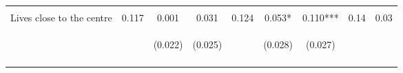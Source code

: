 \begin{table}[h!]
{\begin{tabular}{lcccccccc}
 & \begin{footnotesize}\end{footnotesize} & \begin{footnotesize}[0.041]\end{footnotesize} & \begin{footnotesize}[0.001]\end{footnotesize} & \begin{footnotesize}\end{footnotesize} & \begin{footnotesize}[1.000]\end{footnotesize} & \begin{footnotesize}[0.371]\end{footnotesize} & \begin{footnotesize}\end{footnotesize} & \begin{footnotesize}\end{footnotesize}\\
\noalign{\smallskip}Lives close to the centre & 0.117 & 0.001 & 0.031 & 0.124 & 0.053* & 0.110*** & 0.14 & 0.03\\
 & \begin{footnotesize}\end{footnotesize} & \begin{footnotesize}(0.022)\end{footnotesize} & \begin{footnotesize}(0.025)\end{footnotesize} & \begin{footnotesize}\end{footnotesize} & \begin{footnotesize}(0.028)\end{footnotesize} & \begin{footnotesize}(0.027)\end{footnotesize} & \begin{footnotesize}\end{footnotesize} & \begin{footnotesize}\end{footnotesize}\\
 & \begin{footnotesize}\end{footnotesize} & \begin{footnotesize}[0.240]\end{footnotesize} & \begin{footnotesize}[0.046]\end{footnotesize} & \begin{footnotesize}\end{footnotesize} & \begin{footnotesize}[0.435]\end{footnotesize} & \begin{footnotesize}[0.001]\end{footnotesize} & \begin{footnotesize}\end{footnotesize} & \begin{footnotesize}\end{footnotesize}\\

\end{tabular}}
\end{table}

